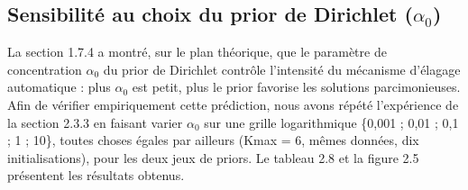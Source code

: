 \subsection{Sensibilité au choix du prior de Dirichlet ($\alpha _{0}$)}
La section 1.7.4 a montré, sur le plan théorique, que le paramètre de concentration $\alpha _{0}$ du prior de Dirichlet contrôle l'intensité du mécanisme d'élagage automatique : plus $\alpha _{0}$ est petit, plus le prior favorise les solutions parcimonieuses. Afin de vérifier empiriquement cette prédiction, nous avons répété l'expérience de la section 2.3.3 en faisant varier $\alpha _{0}$ sur une grille logarithmique \{0,001 ; 0,01 ; 0,1 ; 1 ; 10\}, toutes choses égales par ailleurs (Kmax = 6, mêmes données, dix initialisations), pour les deux jeux de priors. Le tableau 2.8 et la figure 2.5 présentent les résultats obtenus.

